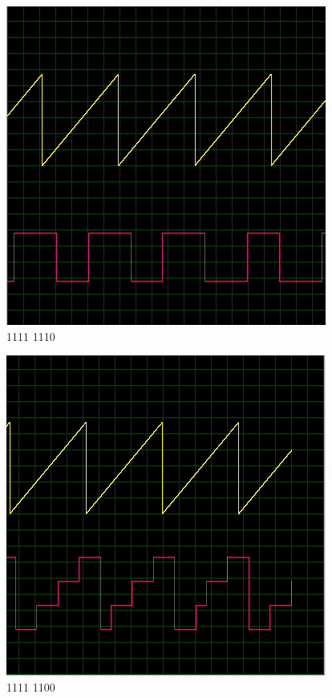 \begin{multicols}{2}
\begin{figure}[H]
\centering
\includegraphics[width=0.8\linewidth]{ImagenesEjercicio1/bit1.png}
\caption{1111 1110}
\end{figure}
\begin{figure}[H]
\centering
\includegraphics[width=0.8\linewidth]{ImagenesEjercicio1/bit2.png}
\caption{1111 1100}
\end{figure}
\begin{figure}[H]
\centering

\end{figure}
\end{multicols}

